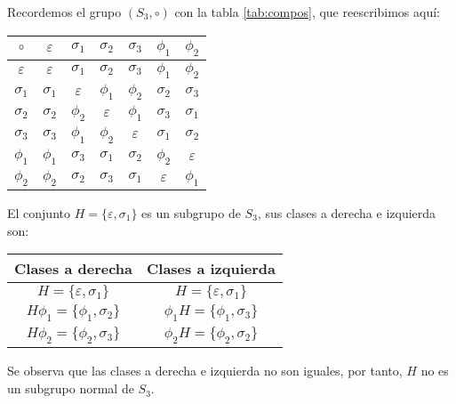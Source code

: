 	\begin{fmd-example}
		Recordemos el grupo $(S_3, \circ)$ con la tabla \ref{tab:compos}, que reescribimos aquí:
		\begin{table}[H]
			\centering
			\begin{tabular}{c|cccccc}
				$\circ$ & $\varepsilon$ & $\sigma_1$ & $\sigma_2$ & $\sigma_3$ & $\phi_1$ & $\phi_2$ \\ \hline
				$\varepsilon$ & $\varepsilon$ & $\sigma_1$ & $\sigma_2$ & $\sigma_3$ & $\phi_1$ & $\phi_2$ \\
				$\sigma_1$ & $\sigma_1$ & $\varepsilon$ & $\phi_1$ & $\phi_2$ & $\sigma_2$ & $\sigma_3$ \\
				$\sigma_2$ & $\sigma_2$ & $\phi_2$ & $\varepsilon$ & $\phi_1$ & $\sigma_3$ & $\sigma_1$\\
				$\sigma_3$ & $\sigma_3$ & $\phi_1$ & $\phi_2$ & $\varepsilon$ & $\sigma_1$ & $\sigma_2$\\
				$\phi_1$ & $\phi_1$ & $\sigma_3$ & $\sigma_1$ & $\sigma_2$ & $\phi_2$ & $\varepsilon$\\
				$\phi_2$ & $\phi_2$ & $\sigma_2$ & $\sigma_3$ & $\sigma_1$ & $\varepsilon$ & $\phi_1$\\
			\end{tabular}
		\end{table}
		
		El conjunto $H = \{\varepsilon, \sigma_1\}$ es un subgrupo de $S_3$, sus clases a derecha e izquierda son:
		
		\begin{table}[H]
			\centering
			\begin{tabular}{c|c}
				Clases a derecha & Clases a izquierda\\ \hline
				$H = \{\varepsilon, \sigma_1\}$ & $H = \{ \varepsilon, \sigma_1 \}$\\
				$H\phi_1 = \{ \phi_1, \sigma_2 \}$ & $\phi_1H = \{ \phi_1, \sigma_3 \}$\\
				$H\phi_2 = \{ \phi_2, \sigma_3 \}$ & $\phi_2H = \{ \phi_2, \sigma_2 \}$
			\end{tabular}
		\end{table}
		Se observa que las clases a derecha e izquierda no son iguales, por tanto, $H$ no es un subgrupo normal de $S_3$.
	\end{fmd-example}
	
